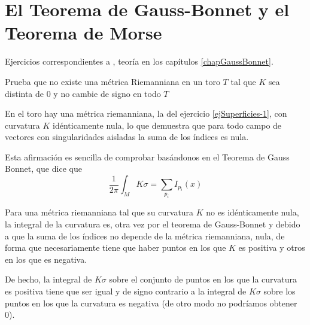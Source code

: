 
\section{El Teorema de Gauss-Bonnet y el Teorema de Morse}

Ejercicios correspondientes a \cite[Capítulo 6]{doCarmo94}, teoría en los capítulos \ref{chapGaussBonnet}.

\begin{problem}[2]
Prueba que no existe una métrica Riemanniana en un toro $T$ tal que $K$ sea distinta de 0 y no cambie de signo en todo $T$
\solution

 

En el toro hay una métrica riemanniana, la del ejercicio \ref{ejSuperficies-1}, con curvatura $K$ idénticamente nula, lo que demuestra que para todo campo de vectores con singularidades aisladas la suma de los índices es nula.

Esta afirmación es sencilla de comprobar basándonos en el Teorema de Gauss Bonnet, que dice que
\[\frac{1}{2π}\int_M Kσ = \sum_{p_i} I_{p_i}(x)\]

Para una métrica riemanniana tal que su curvatura $K$ no es idénticamente nula, la integral de la curvatura es, otra vez por el teorema de Gauss-Bonnet y debido a que la suma de los índices no depende de la métrica riemanniana, nula, de forma que necesariamente tiene que haber puntos en los que $K$ es positiva y otros en los que es negativa.

De hecho, la integral de $Kσ$ sobre el conjunto de puntos en los que la curvatura es positiva tiene que ser igual y de signo contrario a la integral de $Kσ$ sobre los puntos en los que la curvatura es negativa (de otro modo no podríamos obtener 0).

\end{problem}

